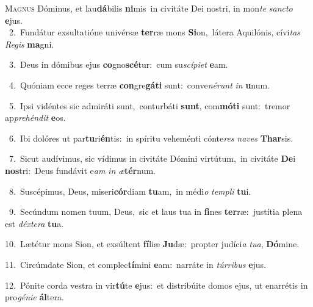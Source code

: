 \lettrine{\initial\textcolor{\initialcolor}{M}}{agnus} Dóminus, et lau\-\textbf{dá}\-bilis \textbf{ni}\-mis~\star in civitáte Dei nostri, in mon\textit{te} \textit{sanc}\-\textit{to} \textbf{e}\-jus.\\
{\numbfont\textcolor{\numbcolor}{~2.}}~Fundátur exsultatióne univérsæ \textbf{ter}\-ræ mons \textbf{Si}\-on,~\star látera Aquilónis, cívi\textit{tas} \textit{Re}\-\textit{gis} \textbf{ma}\-gni.\par
{\numbfont\textcolor{\numbcolor}{~3.}}~Deus in dómibus ejus \textbf{co}\-gno\-\textbf{scé}\-tur:~\star cum su\-\textit{scí}\-\textit{pi}\textit{et} \textbf{e}\-am.\par
{\numbfont\textcolor{\numbcolor}{~4.}}~Quóniam ecce reges terræ \textbf{con}\-gre\-\textbf{gá}\-\textbf{ti} sunt:~\star conve\-\textit{né}\-\textit{runt} \textit{in} \textbf{u}\-num.\par
{\numbfont\textcolor{\numbcolor}{~5.}}~Ipsi vidéntes sic admiráti sunt,~\dagger conturbáti \textbf{sunt}\-, com\-\textbf{mó}\-\textbf{ti} sunt:~\star tremor ap\-\textit{pre}\-\textit{hén}\textit{dit} \textbf{e}\-os.\par
{\numbfont\textcolor{\numbcolor}{~6.}}~Ibi dolóres ut par\-\textbf{tu}\-ri\-\textbf{én}\-tis:~\star in spíritu veheménti cónte\textit{res} \textit{na}\-\textit{ves} \textbf{Thar}\-sis.\par
{\numbfont\textcolor{\numbcolor}{~7.}}~Sicut audívimus, sic vídimus in civitáte Dómini virtútum,~\dagger in civitáte \textbf{De}\-i \textbf{nos}\-tri:~\star Deus fundávit e\textit{am} \textit{in} \textit{æ}\-\textbf{tér}num.\par
{\numbfont\textcolor{\numbcolor}{~8.}}~Suscépimus, Deus, miseri\-\textbf{cór}\-diam \textbf{tu}\-am,~\star in médi\textit{o} \textit{tem}\-\textit{pli} \textbf{tu}\-i.\par
{\numbfont\textcolor{\numbcolor}{~9.}}~Secúndum nomen tuum, Deus,~\dagger sic et laus tua in \textbf{fi}\-nes \textbf{ter}\-ræ:~\star justítia plena est \textit{déx}\-\textit{te}\textit{ra} \textbf{tu}\-a.\par
{\numbfont\textcolor{\numbcolor}{10.}}~Lætétur mons Sion, et exsúltent \textbf{fí}\-liæ \textbf{Ju}\-dæ:~\star propter judíci\textit{a} \textit{tu}\-\textit{a}, \textbf{Dó}\-mine.\par
{\numbfont\textcolor{\numbcolor}{11.}}~Circúmdate Sion, et complec\-\textbf{tí}\-mini \textbf{e}\-am:~\star narráte in \textit{túr}\-\textit{ri}\textit{bus} \textbf{e}\-jus.\par
{\numbfont\textcolor{\numbcolor}{12.}}~Pónite corda vestra in vir\-\textbf{tú}\-te \textbf{e}\-jus:~\star et distribúite domos ejus, ut enarrétis in pro\-\textit{gé}\-\textit{ni}\textit{e} \textbf{ál}\-tera.\par

